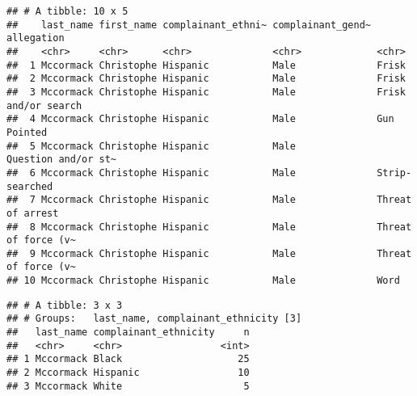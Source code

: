 \documentclass[
]{article}
\newenvironment{Shaded}{\begin{snugshade}}{\end{snugshade}}
\newcommand{\CommentTok}[1]{\textcolor[rgb]{0.56,0.35,0.01}{\textit{#1}}}
\newcommand{\KeywordTok}[1]{\textcolor[rgb]{0.13,0.29,0.53}{\textbf{#1}}}
\newcommand{\NormalTok}[1]{#1}
\newcommand{\OperatorTok}[1]{\textcolor[rgb]{0.81,0.36,0.00}{\textbf{#1}}}
\newcommand{\StringTok}[1]{\textcolor[rgb]{0.31,0.60,0.02}{#1}}
\begin{document}
\begin{verbatim}
## # A tibble: 10 x 5
##    last_name first_name complainant_ethni~ complainant_gend~ allegation         
##    <chr>     <chr>      <chr>              <chr>             <chr>              
##  1 Mccormack Christophe Hispanic           Male              Frisk              
##  2 Mccormack Christophe Hispanic           Male              Frisk              
##  3 Mccormack Christophe Hispanic           Male              Frisk and/or search
##  4 Mccormack Christophe Hispanic           Male              Gun Pointed        
##  5 Mccormack Christophe Hispanic           Male              Question and/or st~
##  6 Mccormack Christophe Hispanic           Male              Strip-searched     
##  7 Mccormack Christophe Hispanic           Male              Threat of arrest   
##  8 Mccormack Christophe Hispanic           Male              Threat of force (v~
##  9 Mccormack Christophe Hispanic           Male              Threat of force (v~
## 10 Mccormack Christophe Hispanic           Male              Word
\end{verbatim}

\begin{Shaded}
\end{Shaded}

\begin{verbatim}
## # A tibble: 3 x 3
## # Groups:   last_name, complainant_ethnicity [3]
##   last_name complainant_ethnicity     n
##   <chr>     <chr>                 <int>
## 1 Mccormack Black                    25
## 2 Mccormack Hispanic                 10
## 3 Mccormack White                     5
\end{verbatim}
\end{document}
